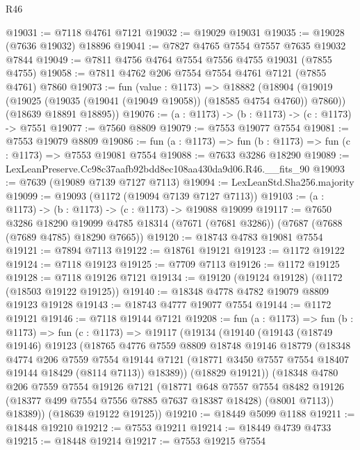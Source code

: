 \begin{lexlean}{R46}
\begin{coremodule}
@19031 := @7118 @4761 @7121
@19032 := @19029 @19031
@19035 := @19028 (@7636 @19032) @18896
@19041 := @7827 @4765 @7554 @7557 @7635 @19032 @7844
@19049 := @7811 @4756 @4764 @7554 @7556 @4755 @19031 (@7855 @4755)
@19058 := @7811 @4762 @206 @7554 @7554 @4761 @7121 (@7855 @4761) @7860
@19073 := fun (value : @1173) =>
  @18882
    (@18904
      (@19019 (@19025 (@19035 (@19041 (@19049 @19058)) (@18585 @4754 @4760)) @7860))
      (@18639 @18891 @18895))
@19076 := (a : @1173) -> (b : @1173) -> (c : @1173) -> @7551
@19077 := @7560 @8809
@19079 := @7553 @19077 @7554
@19081 := @7553 @19079 @8809
@19086 := fun (a : @1173) => fun (b : @1173) => fun (c : @1173) => @7553 @19081 @7554
@19088 := @7633 @3286 @18290
@19089 := LexLeanPreserve.Cc98c37aafb92bdd8ec108aa430da9d06.R46.__fits_90
@19093 := @7639 (@19089 @7139 @7127 @7113)
@19094 := LexLeanStd.Sha256.majority
@19099 := @19093 (@1172 (@19094 @7139 @7127 @7113))
@19103 := (a : @1173) -> (b : @1173) -> (c : @1173) -> @19088 @19099
@19117 := @7650
    @3286
    @18290
    @19099
    @4785
    @18314
    (@7671 (@7681 @3286))
    (@7687 (@7688 (@7689 @4785) @18290 @7665))
@19120 := @18743 @4783 @19081 @7554
@19121 := @7894 @7113
@19122 := @18761 @19121
@19123 := @1172 @19122
@19124 := @7118 @19123
@19125 := @7709 @7113
@19126 := @1172 @19125
@19128 := @7118 @19126 @7121
@19134 := @19120 (@19124 @19128) (@1172 (@18503 @19122 @19125))
@19140 := @18348 @4778 @4782 @19079 @8809 @19123 @19128
@19143 := @18743 @4777 @19077 @7554
@19144 := @1172 @19121
@19146 := @7118 @19144 @7121
@19208 := fun (a : @1173) =>
  fun (b : @1173) =>
  fun (c : @1173) =>
  @19117
    (@19134
      (@19140
        (@19143
          (@18749 @19146)
          @19123
          (@18765
            @4776
            @7559
            @8809
            @18748
            @19146
            @18779
            (@18348
              @4774
              @206
              @7559
              @7554
              @19144
              @7121
              (@18771 @3450 @7557 @7554 @18407 @19144 @18429 (@8114 @7113))
              @18389))
          (@18829 @19121))
        (@18348
          @4780
          @206
          @7559
          @7554
          @19126
          @7121
          (@18771
            @648
            @7557
            @7554
            @8482
            @19126
            (@18377 @499 @7554 @7556 @7885 @7637 @18387 @18428)
            (@8001 @7113))
          @18389))
      (@18639 @19122 @19125))
@19210 := @18449 @5099 @1188
@19211 := @18448 @19210
@19212 := @7553 @19211
@19214 := @18449 @4739 @4733
@19215 := @18448 @19214
@19217 := @7553 @19215 @7554

\end{coremodule}
\end{lexlean}
